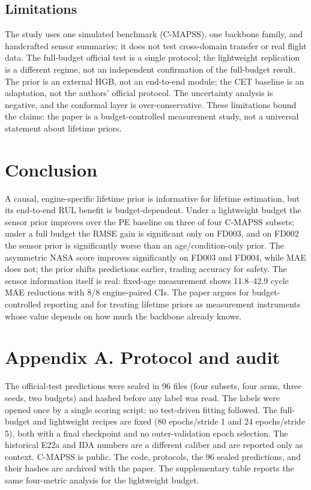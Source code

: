 \documentclass[journal]{IEEEtran}
\begin{document}
\subsection{Limitations}
The study uses one simulated benchmark (C-MAPSS), one backbone family, and handcrafted sensor summaries; it does not test cross-domain transfer or real flight data. The full-budget official test is a single protocol; the lightweight replication is a different regime, not an independent confirmation of the full-budget result. The prior is an external HGB, not an end-to-end module; the CET baseline is an adaptation, not the authors' official protocol. The uncertainty analysis is negative, and the conformal layer is over-conservative. These limitations bound the claims: the paper is a budget-controlled measurement study, not a universal statement about lifetime priors.

\section{Conclusion}
A causal, engine-specific lifetime prior is informative for lifetime estimation, but its end-to-end RUL benefit is budget-dependent. Under a lightweight budget the sensor prior improves over the PE baseline on three of four C-MAPSS subsets; under a full budget the RMSE gain is significant only on FD003, and on FD002 the sensor prior is significantly worse than an age/condition-only prior. The asymmetric NASA score improves significantly on FD003 and FD004, while MAE does not; the prior shifts predictions earlier, trading accuracy for safety. The sensor information itself is real: fixed-age measurement shows 11.8--42.9 cycle MAE reductions with 8/8 engine-paired CIs. The paper argues for budget-controlled reporting and for treating lifetime priors as measurement instruments whose value depends on how much the backbone already knows.

\section*{Appendix A. Protocol and audit}
The official-test predictions were sealed in 96 files (four subsets, four arms, three seeds, two budgets) and hashed before any label was read. The labels were opened once by a single scoring script; no test-driven fitting followed. The full-budget and lightweight recipes are fixed (80 epochs/stride 1 and 24 epochs/stride 5), both with a final checkpoint and no outer-validation epoch selection. The historical E22a and IDA numbers are a different caliber and are reported only as context. C-MAPSS is public. The code, protocols, the 96 sealed predictions, and their hashes are archived with the paper. The supplementary table reports the same four-metric analysis for the lightweight budget.
\end{document}
